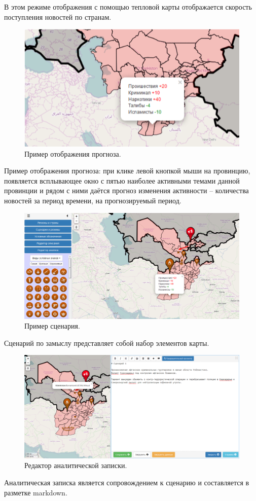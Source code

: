 В этом режиме отображения с помощью тепловой карты отображается скорость поступления новостей по странам.

\begin{figure}[!h]
\centering
\includegraphics[width=\textwidth]{technology/gui/4}
\caption{Пример отображения прогноза.}
\label{figure:gui4}
\end{figure}

Пример отображения прогноза: при клике левой кнопкой мыши на провинцию, появляется всплывающее окно с пятью наиболее активными темами данной провинции и рядом с ними даётся прогноз изменения активности -- количества новостей за период времени, на прогнозируемый период.

\begin{figure}[!h]
\centering
\includegraphics[width=\textwidth]{technology/gui/5}
\caption{Пример сценария.}
\label{figure:gui5}
\end{figure}

Сценарий по замыслу представляет собой набор элементов карты.

\begin{figure}[!h]
\centering
\includegraphics[width=\textwidth]{technology/gui/6}
\caption{Редактор аналитической записки.}
\label{figure:gui6}
\end{figure}

Аналитическая записка является сопровождением к сценарию и составляется в разметке markdown.